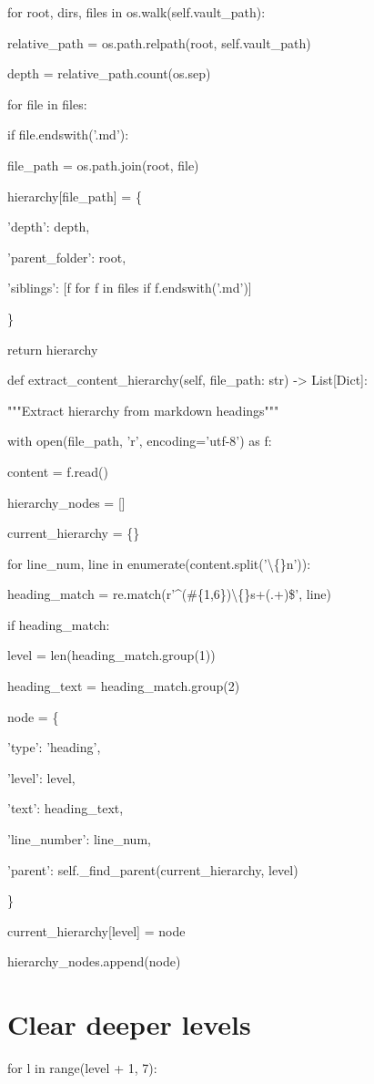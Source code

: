 \documentclass[a4paper,11pt]{article}
\begin{document}
for root, dirs, files in os.walk(self.vault\_path):

relative\_path = os.path.relpath(root, self.vault\_path)

depth = relative\_path.count(os.sep)


for file in files:

if file.endswith('.md'):

file\_path = os.path.join(root, file)

hierarchy[file\_path] = \{

'depth': depth,

'parent\_folder': root,

'siblings': [f for f in files if f.endswith('.md')]

\}


return hierarchy


def extract\_content\_hierarchy(self, file\_path: str) -> List[Dict]:

"""Extract hierarchy from markdown headings"""

with open(file\_path, 'r', encoding='utf-8') as f:

content = f.read()


hierarchy\_nodes = []

current\_hierarchy = \{\}


for line\_num, line in enumerate(content.split('\textbackslash\{\}n')):

heading\_match = re.match(r'\textasciicircum{}(\#\{1,6\})\textbackslash\{\}s+(.+)\$', line)


if heading\_match:

level = len(heading\_match.group(1))

heading\_text = heading\_match.group(2)


node = \{

'type': 'heading',

'level': level,

'text': heading\_text,

'line\_number': line\_num,

'parent': self.\_find\_parent(current\_hierarchy, level)

\}


current\_hierarchy[level] = node

hierarchy\_nodes.append(node)


\section{Clear deeper levels}
for l in range(level + 1, 7):
\end{document}
